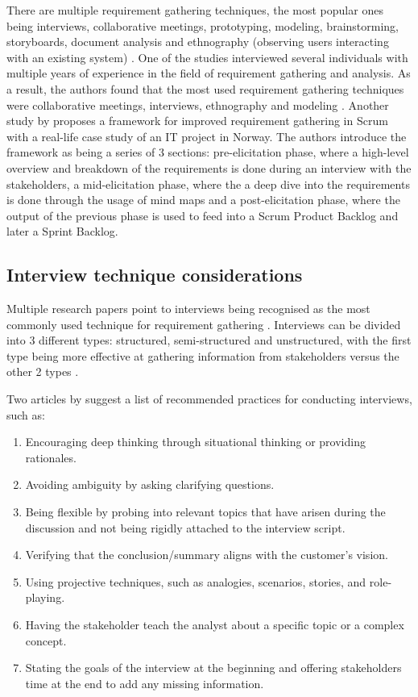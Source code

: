 There are multiple requirement gathering techniques, the most popular ones being interviews, collaborative meetings, prototyping, modeling, brainstorming, storyboards, document analysis and ethnography (observing users interacting with an existing system) \parencite{reqanalysis1,reqanalysis2, reqanalysis3, reqanalysis4}. One of the studies interviewed  several individuals with multiple years of experience in the field of requirement gathering and analysis. As a result, the authors found that the most used requirement gathering techniques were collaborative meetings, interviews, ethnography and modeling \parencite{reqanalysis1}. Another study by \textcite{reqanalysis6} proposes a framework for improved requirement gathering in Scrum with a real-life case study of an IT project in Norway. The authors introduce the framework as being a series of 3 sections: pre-elicitation phase, where a high-level overview and breakdown of the requirements is done during an interview with the stakeholders, a mid-elicitation phase, where the a deep dive into the requirements is done through the usage of mind maps and a post-elicitation phase, where the output of the previous phase is used to feed into a Scrum Product Backlog and later a Sprint Backlog.

\subsection{Interview technique considerations}

Multiple research papers point to interviews being recognised as the most commonly used technique for requirement gathering \parencite{interviews5,interviews1,interviews2}. Interviews can be divided into 3 different types: structured, semi-structured and unstructured, with the first type being more effective at gathering information from stakeholders versus the other 2 types \parencite{interviews5,interviews6}. 

Two articles by \textcite{interviews4, interviews3} suggest a list of recommended practices for conducting interviews, such as:
\begin{enumerate}
    \item Encouraging deep thinking through situational thinking or providing rationales.
    \item Avoiding ambiguity by asking clarifying questions.
    \item Being flexible by probing into relevant topics that have arisen during the discussion and not being rigidly attached to the interview script.
    \item Verifying that the conclusion/summary aligns with the customer's vision.
    \item Using projective techniques, such as analogies, scenarios, stories, and role-playing.
    \item Having the stakeholder teach the analyst about a specific topic or a complex concept.
    \item Stating the goals of the interview at the beginning and offering stakeholders time at the end to add any missing information.
\end{enumerate}

